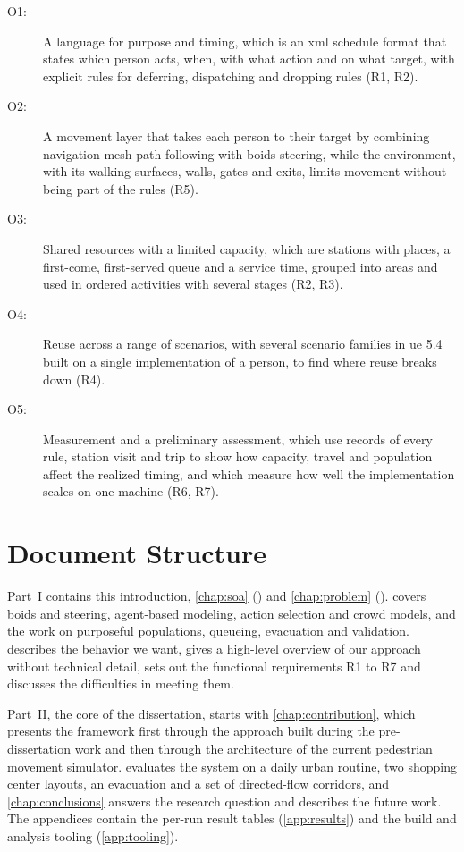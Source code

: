 \begin{description}
\item[O1:] A language for purpose and timing, which is an \gls{xml} schedule format that states which person acts, when, with what action and on what target, with explicit rules for deferring, dispatching and dropping rules (R1, R2).
\item[O2:] A movement layer that takes each person to their target by combining navigation mesh path following with boids steering, while the environment, with its walking surfaces, walls, gates and exits, limits movement without being part of the rules (R5).
\item[O3:] Shared resources with a limited capacity, which are stations with places, a first-come, first-served queue and a service time, grouped into areas and used in ordered activities with several stages (R2, R3).
\item[O4:] Reuse across a range of scenarios, with several scenario families in \gls{ue} 5.4 built on a single implementation of a person, to find where reuse breaks down (R4).
\item[O5:] Measurement and a preliminary assessment, which use records of every rule, station visit and trip to show how capacity, travel and population affect the realized timing, and which measure how well the implementation scales on one machine (R6, R7).
\end{description}

\section{Document Structure}\label{sec:intro-structure}

Part~I contains this introduction, \cref{chap:soa} () and \cref{chap:problem} ().  covers boids and steering, agent-based modeling, action selection and crowd models, and the work on purposeful populations, queueing, evacuation and validation.  describes the behavior we want, gives a high-level overview of our approach without technical detail, sets out the functional requirements R1 to R7 and discusses the difficulties in meeting them.

Part~II, the core of the dissertation, starts with \cref{chap:contribution}, which presents the framework first through the approach built during the pre-dissertation work and then through the architecture of the current pedestrian movement simulator.  evaluates the system on a daily urban routine, two shopping center layouts, an evacuation and a set of directed-flow corridors, and \cref{chap:conclusions} answers the research question and describes the future work. The appendices contain the per-run result tables (\cref{app:results}) and the build and analysis tooling (\cref{app:tooling}).
